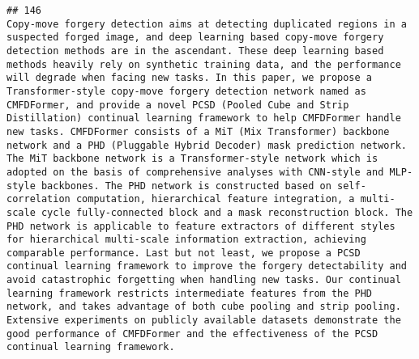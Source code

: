 \documentclass[
]{article}
\begin{document}
\begin{verbatim}
## 146                                                                                                                                                                                                                                                                        Copy-move forgery detection aims at detecting duplicated regions in a suspected forged image, and deep learning based copy-move forgery detection methods are in the ascendant. These deep learning based methods heavily rely on synthetic training data, and the performance will degrade when facing new tasks. In this paper, we propose a Transformer-style copy-move forgery detection network named as CMFDFormer, and provide a novel PCSD (Pooled Cube and Strip Distillation) continual learning framework to help CMFDFormer handle new tasks. CMFDFormer consists of a MiT (Mix Transformer) backbone network and a PHD (Pluggable Hybrid Decoder) mask prediction network. The MiT backbone network is a Transformer-style network which is adopted on the basis of comprehensive analyses with CNN-style and MLP-style backbones. The PHD network is constructed based on self-correlation computation, hierarchical feature integration, a multi-scale cycle fully-connected block and a mask reconstruction block. The PHD network is applicable to feature extractors of different styles for hierarchical multi-scale information extraction, achieving comparable performance. Last but not least, we propose a PCSD continual learning framework to improve the forgery detectability and avoid catastrophic forgetting when handling new tasks. Our continual learning framework restricts intermediate features from the PHD network, and takes advantage of both cube pooling and strip pooling. Extensive experiments on publicly available datasets demonstrate the good performance of CMFDFormer and the effectiveness of the PCSD continual learning framework.

\end{verbatim}
\end{document}
